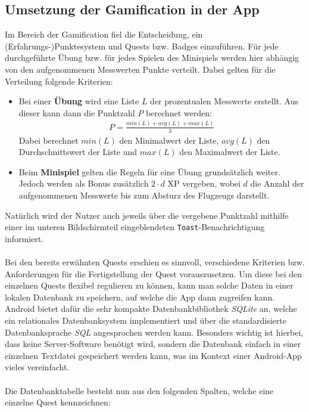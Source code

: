 \subsection{Umsetzung der Gamification in der App}
Im Bereich der Gamification fiel die Entscheidung, ein (Erfahrungs-)Punktesystem und Quests bzw. Badges einzuführen. Für jede durchgeführte Übung bzw. für jedes Spielen des Minispiels werden hier abhängig von den aufgenommenen Messwerten Punkte verteilt. Dabei gelten für die Verteilung folgende Kriterien:
\begin{itemize}
	\item Bei einer \textbf{Übung} wird eine Liste $L$ der prozentualen Messwerte erstellt. Aus dieser kann dann die Punktzahl $P$ berechnet werden:
	\begin{align*}
	P = \frac{min(L) + avg(L) + max(L)}{3}
	\end{align*}
	Dabei berechnet $min(L)$ den Minimalwert der Liste, $avg(L)$ den Durchschnittswert der Liste und $max(L)$ den Maximalwert der Liste.
	\item Beim \textbf{Minispiel} gelten die Regeln für eine Übung grundsätzlich weiter. Jedoch werden als Bonus zusätzlich $2 \cdot d$ XP vergeben, wobei $d$ die Anzahl der aufgenommenen Messwerte bis zum Absturz des Flugzeugs darstellt.
\end{itemize}
Natürlich wird der Nutzer auch jeweils über die vergebene Punktzahl mithilfe einer im unteren Bildschirmteil eingeblendeten \texttt{Toast}-Benachrichtigung informiert. \\ \\
Bei den bereits erwähnten Quests erschien es sinnvoll, verschiedene Kriterien bzw. Anforderungen für die Fertigstellung der Quest vorauszusetzen. Um diese bei den einzelnen Quests flexibel regulieren zu können, kann man solche Daten in einer lokalen Datenbank zu speichern, auf welche die App dann zugreifen kann. Android bietet dafür die sehr kompakte Datenbankbibliothek \textit{SQLite} an, welche ein relationales Datenbanksystem implementiert und über die standardisierte Datenbanksprache \textit{SQL} angesprochen werden kann.\cite{Src:AndroidKuenneth} Besonders wichtig ist hierbei, dass keine Server-Software benötigt wird, sondern die Datenbank einfach in einer einzelnen Textdatei gespeichert werden kann, was im Kontext einer Android-App vieles vereinfacht.\cite{Src:AndroidKuenneth} \\ \\
Die Datenbanktabelle besteht nun aus den folgenden Spalten, welche eine einzelne Quest kennzeichnen:
